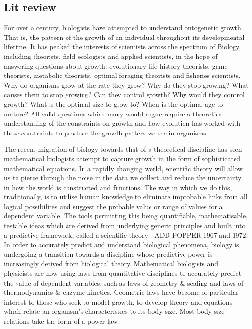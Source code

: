 \documentclass[a4paper]{article} %
\begin{document}
    \subsection{Lit review}
        For over a century, biologists have attempted to understand ontogenetic growth. That is, the pattern of the growth of an individual throughout its developmental lifetime. It has peaked the interests of scientists across the spectrum of Biology, including theorists, field ecologists and applied scientists, in the hope of answering questions about growth. evolutionary life history theorists, game theorists, metabolic theorists, optimal foraging theorists and fisheries scientists. Why do organisms grow at the rate they grow? Why do they stop growing? What causes them to stop growing? Can they control growth? Why would they control growth? What is the optimal size to grow to? When is the optimal age to mature? All valid questions which many would argue require a theoretical understanding of the constraints on growth and how evolution has worked with these constraints to produce the growth patters we see in organisms.

        The recent migration of biology towards that of a theoretical discipline has seen mathematical biologists attempt to capture growth in the form of sophisticated mathematical equations. In a rapidly changing world, scientific theory will allow us to pierce through the noise in the data we collect and reduce the uncertainty in how the world is constructed and functions. The way in which we do this, traditionally, is to utilise human knowledge to eliminate improbable links from all logical possibilites and suggest the probable value or range of values for a dependent variable. The tools permitting this being quantifiable, mathematisable, testable ideas which are derived from underlying generic principles and built into a predictive framework, called a scientific theory \autocite{peters1983, West2011}. ADD POPPER 1967 and 1972. In order to accurately predict and understand biological phenomena, biology is undergoing a transition towards a discipline whose predictive power is increasingly derived from  biological theory. Mathematical biologists and physicists are now using laws from quantitative disciplines to accurately predict the value of dependent variables, such as laws of geometry \& scaling and laws of thermodynamics \& enzyme kinetics. Geometric laws have become of particular interest to those who seek to model growth, to develop theory and equations which relate an organism's characteristics to its body size. Most body size relations take the form of a power law:
\end{document}
